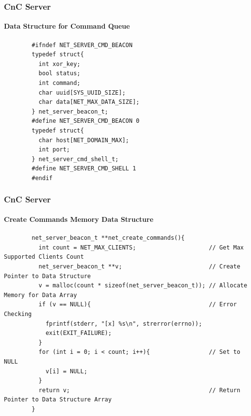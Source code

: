 \documentclass[aspectratio=169]{beamer}
\begin{document}
\begin{frame}[fragile]{}
  \frametitle{CnC Server}
  \framesubtitle{Data Structure for Command Queue}
  \begin{center}
    \begin{tcolorbox}[title=net.c,colback=black]
    \begin{minipage}{0.5\textwidth}
      \begin{verbatim}
        #ifndef NET_SERVER_CMD_BEACON
        typedef struct{
          int xor_key;
          bool status;
          int command;
          char uuid[SYS_UUID_SIZE];
          char data[NET_MAX_DATA_SIZE];
        } net_server_beacon_t;
        #define NET_SERVER_CMD_BEACON 0
        typedef struct{
          char host[NET_DOMAIN_MAX];
          int port;
        } net_server_cmd_shell_t;
        #define NET_SERVER_CMD_SHELL 1
        #endif
      \end{verbatim}
    \end{minipage}
    \end{tcolorbox}
  \end{center}
\end{frame}

\begin{frame}[fragile]{}
  \frametitle{CnC Server}
  \framesubtitle{Create Commands Memory Data Structure}
  \begin{center}
    \begin{tcolorbox}[title=net.c,colback=black]
    \begin{minipage}{0.5\textwidth}
      \begin{verbatim}
        net_server_beacon_t **net_create_commands(){
          int count = NET_MAX_CLIENTS;                     // Get Max Supported Clients Count
          net_server_beacon_t **v;                         // Create Pointer to Data Structure
          v = malloc(count * sizeof(net_server_beacon_t)); // Allocate Memory for Data Array
          if (v == NULL){                                  // Error Checking
            fprintf(stderr, "[x] %s\n", strerror(errno));
            exit(EXIT_FAILURE);
          }
          for (int i = 0; i < count; i++){                 // Set to NULL
            v[i] = NULL;
          }
          return v;                                        // Return Pointer to Data Structure Array
        }
      \end{verbatim}
    \end{minipage}
    \end{tcolorbox}
  \end{center}
\end{frame}
\end{document}
